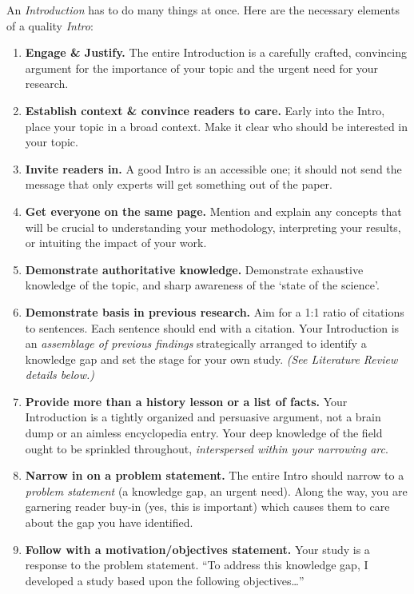 \documentclass[
]{book}
\begin{document}
An \emph{Introduction} has to do many things at once. Here are the necessary elements of a quality \emph{Intro}:

\begin{enumerate}
\def\labelenumi{\arabic{enumi}.}
\item
  \textbf{Engage \& Justify.} The entire Introduction is a carefully crafted, convincing argument for the importance of your topic and the urgent need for your research.
\item
  \textbf{Establish context \& convince readers to care.} Early into the Intro, place your topic in a broad context. Make it clear who should be interested in your topic.
\item
  \textbf{Invite readers in.} A good Intro is an accessible one; it should not send the message that only experts will get something out of the paper.
\item
  \textbf{Get everyone on the same page.} Mention and explain any concepts that will be crucial to understanding your methodology, interpreting your results, or intuiting the impact of your work.
\item
  \textbf{Demonstrate authoritative knowledge.} Demonstrate exhaustive knowledge of the topic, and sharp awareness of the `state of the science'.
\item
  \textbf{Demonstrate basis in previous research.} Aim for a 1:1 ratio of citations to sentences. Each sentence should end with a citation. Your Introduction is an \emph{assemblage of previous findings} strategically arranged to identify a knowledge gap and set the stage for your own study. \emph{(See Literature Review details below.)}
\item
  \textbf{Provide more than a history lesson or a list of facts.} Your Introduction is a tightly organized and persuasive argument, not a brain dump or an aimless encyclopedia entry. Your deep knowledge of the field ought to be sprinkled throughout, \emph{interspersed within your narrowing arc}.
\item
  \textbf{Narrow in on a problem statement.} The entire Intro should narrow to a \emph{problem statement} (a knowledge gap, an urgent need). Along the way, you are garnering reader buy-in (yes, this is important) which causes them to care about the gap you have identified.
\item
  \textbf{Follow with a motivation/objectives statement.} Your study is a response to the problem statement. ``To address this knowledge gap, I developed a study based upon the following objectives\ldots{}''
\end{enumerate}
\end{document}

